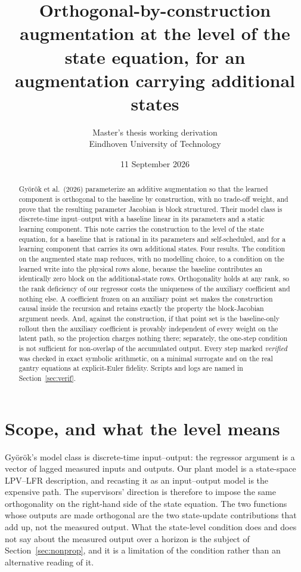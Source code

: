 \documentclass[11pt,a4paper]{article}
\title{Orthogonal-by-construction augmentation\newline
at the level of the state equation,\newline
for an augmentation carrying additional states}
\author{Master's thesis working derivation\\Eindhoven University of Technology}
\date{11 September 2026}
\theoremstyle{remark}
\begin{document}
\maketitle

\begin{abstract}
Gy\"or\"ok et al.\ (2026) parameterize an additive augmentation so that the learned component is
orthogonal to the baseline by construction, with no trade-off weight, and prove that the
resulting parameter Jacobian is block structured. Their model class is discrete-time
input--output with a baseline linear in its parameters and a static learning component. This note
carries the construction to the level of the state equation, for a baseline that is rational in
its parameters and self-scheduled, and for a learning component that carries its own additional
states. Four results. The condition on the augmented state map reduces, with no modelling choice,
to a condition on the learned write into the physical rows alone, because the baseline contributes
an identically zero block on the additional-state rows. Orthogonality holds at any rank, so the
rank deficiency of our regressor costs the uniqueness of the auxiliary coefficient and nothing
else. A coefficient frozen on an auxiliary point set makes the construction causal inside the
recursion and retains exactly the property the block-Jacobian argument needs. And, against the
construction, if that point set is the baseline-only rollout then the auxiliary coefficient is
provably independent of every weight on the latent path, so the projection charges nothing there;
separately, the one-step condition is not sufficient for non-overlap of the accumulated output.
Every step marked \emph{verified} was checked in exact symbolic arithmetic, on a minimal surrogate
and on the real gantry equations at explicit-Euler fidelity. Scripts and logs are named in
Section~\ref{sec:verif}.
\end{abstract}

\tableofcontents

\section{Scope, and what the level means}

Gy\"or\"ok's model class is discrete-time input--output: the regressor argument is a vector of
lagged measured inputs and outputs. Our plant model is a state-space LPV--LFR description, and
recasting it as an input--output model is the expensive path. The supervisors' direction is
therefore to impose the same orthogonality on the right-hand side of the state equation. The two
functions whose outputs are made orthogonal are the two state-update contributions that add up,
not the measured output. What the state-level condition does and does not say about the measured
output over a horizon is the subject of Section~\ref{sec:nonprop}, and it is a limitation of the
condition rather than an alternative reading of it.
\end{document}
